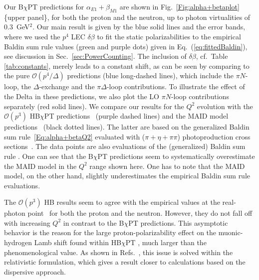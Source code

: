 \documentclass[12pt,preprint,tightenlines,
showpacs,preprintnumbers,amsmath,amssymb,
a4paper,nofootinbib]{revtex4-2}
\def\Eqref#1{Eq.~(\ref{eq:#1})}
\begin{document}
Our B$\chi$PT predictions for $\alpha_{E1}+\beta_{M1}$ are shown in Fig.~\ref{Fig:alpha+betaplot} \{upper panel\}, for both the proton
and the neutron, up to photon virtualities of $0.3$~GeV$^2$. Our main result is given by the blue solid lines and the error bands, where we used the $p^4$ LEC $\delta\beta$ to fit the static polarizabilities to the empirical Baldin sum rule values (green and purple dots) given in \Eqref{fittedBaldin}, see discussion in Sec.~\ref{sec:PowerCounting}. The inclusion of
$\delta\beta$, cf.\ Table \ref{tab:constants}, merely leads to a constant shift, as can be seen by comparing to the pure $\mathcal{O}(p^4/\Delta)$ predictions (blue long-dashed lines), which include the $\pi N$-loop, the $\Delta$-exchange and the $\pi \Delta$-loop contributions.  To illustrate the effect of the Delta in these predictions, we also plot the LO $\pi N$-loop contributions
separately (red solid lines). We compare our results for the $Q^2$
evolution with the $\mathcal{O}(p^3)$ HB$\chi$PT predictions~\cite{Nevado:2007dd} (purple dashed lines) and the MAID model predictions~\cite{Drechsel:2000ct,Drechsel:1998hk} (black dotted lines). The latter are based on the generalized Baldin sum rule~\eqref{Eq:alpha+betaQ2} evaluated with ($\pi+\eta+\pi \pi$) photoproduction
cross sections~\cite{Drechsel:2002ar}. 
The data points are also evaluations of the (generalized) Baldin sum rule \cite{Liang:2004tk,Gryniuk:2015aa,Babusci:1997ij}. One can see that the B$\chi$PT predictions seem to systematically overestimate the MAID model in the $Q^2$ range shown here. One has to note that
the MAID model, on the other hand, slightly underestimates the empirical Baldin sum rule evaluations.

The $\mathcal{O}(p^3)$ HB results seem to agree with the empirical values at the real-photon point~\cite{Babusci:1997ij}
 for both the proton and the neutron. However, they do not fall off with increasing $Q^2$ in contrast to the B$\chi$PT predictions.
This asymptotic behavior is the reason for the large proton-polarizability effect on the muonic-hydrogen Lamb shift found within HB$\chi$PT \cite{Nevado:2007dd,Peset:2014yha,Peset:2014jxa}, much larger than the phenomenological value. As shown in Refs.~\cite{Alarcon:2013cba,Lensky:2017bwi}, this issue is solved within the relativistic formulation, which gives a result closer to calculations based on the dispersive approach.
\end{document}
